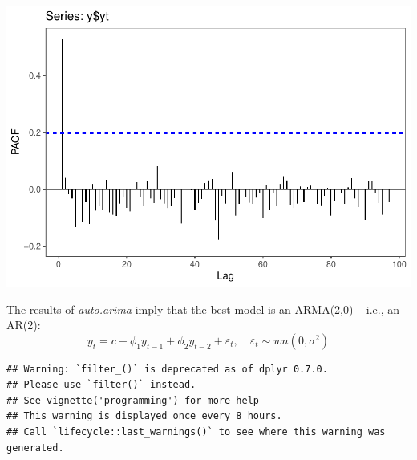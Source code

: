 \documentclass[
]{article}
\newenvironment{Shaded}{\begin{snugshade}}{\end{snugshade}}
\newcommand{\DataTypeTok}[1]{\textcolor[rgb]{0.13,0.29,0.53}{#1}}
\newcommand{\DecValTok}[1]{\textcolor[rgb]{0.00,0.00,0.81}{#1}}
\newcommand{\KeywordTok}[1]{\textcolor[rgb]{0.13,0.29,0.53}{\textbf{#1}}}
\newcommand{\NormalTok}[1]{#1}
\newcommand{\OperatorTok}[1]{\textcolor[rgb]{0.81,0.36,0.00}{\textbf{#1}}}
\newcommand{\StringTok}[1]{\textcolor[rgb]{0.31,0.60,0.02}{#1}}
\begin{document}
\begin{center}\includegraphics{Econo2_P5_files/figure-latex/plots fac facp-4} \end{center}

The results of \emph{auto.arima} imply that the best model is an
ARMA(2,0) -- i.e., an AR(2):
\[ y_t = c + \phi_1 y_{t-1} + \phi_2 y_{t-2} + \varepsilon_t, \hspace{1em} \varepsilon_t \sim wn(0, \sigma^2)\]

\begin{Shaded}
\end{Shaded}

\begin{verbatim}
## Warning: `filter_()` is deprecated as of dplyr 0.7.0.
## Please use `filter()` instead.
## See vignette('programming') for more help
## This warning is displayed once every 8 hours.
## Call `lifecycle::last_warnings()` to see where this warning was generated.
\end{verbatim}
\end{document}
